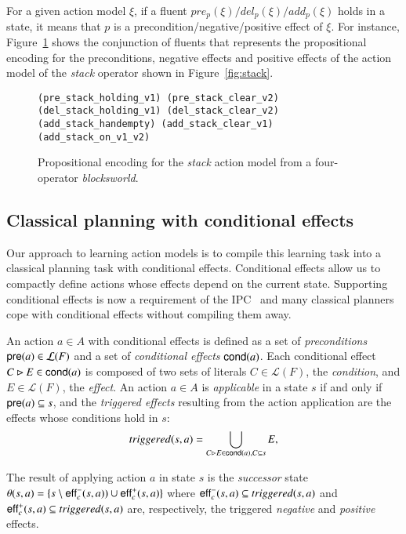 For a given action model $\xi$, if a fluent $pre_p(\xi)/del_p(\xi)/add_p(\xi)$ holds in a state, it means that $p$ is a precondition/negative/positive effect of $\xi$. For instance, Figure~\ref{fig:encodedstack} shows the conjunction of fluents that represents the propositional encoding for the preconditions, negative effects and positive effects of the action model of the {\em stack} operator shown in Figure~\ref{fig:stack}.

\begin{figure}[hbt!]
\begin{footnotesize}
\begin{verbatim}
(pre_stack_holding_v1) (pre_stack_clear_v2)
(del_stack_holding_v1) (del_stack_clear_v2)
(add_stack_handempty) (add_stack_clear_v1) (add_stack_on_v1_v2)
\end{verbatim}
\end{footnotesize}
 \caption{\small Propositional encoding for the {\em stack} action model from a four-operator {\em blocksworld}.}
\label{fig:encodedstack}
\end{figure}


\subsection{Classical planning with conditional effects}
\label{conditional_effects}

Our approach to learning action models is to compile this learning task into a classical planning task with conditional effects.  Conditional effects allow us to compactly define actions whose effects depend on the current state. Supporting conditional effects is now a requirement of the IPC~\cite{vallati:IPC:AIM2015} and many classical planners cope with conditional effects without compiling them away.

An action $a\in A$ with conditional effects is defined as a set of {\em preconditions} $\mathsf{pre}(a)\in\mathcal{L}(F)$ and a set of {\em conditional effects} $\mathsf{cond}(a)$. Each conditional effect $C\rhd E\in\mathsf{cond}(a)$ is composed of two sets of literals $C\in\mathcal{L}(F)$, the {\em condition}, and $E\in\mathcal{L}(F)$, the {\em effect}. An action $a\in A$ is {\em applicable} in a state $s$ if and only if $\mathsf{pre}(a)\subseteq s$, and the {\em triggered effects} resulting from the action application are the effects whose conditions hold in $s$:
\[
triggered(s,a)=\bigcup_{C\rhd E\in\mathsf{cond}(a),C\subseteq s} E,
\]

The result of applying action $a$ in state $s$ is the {\em successor} state $\theta(s,a)=\{s\setminus\mathsf{eff}_c^-(s,a))\cup\mathsf{eff}_c^+(s,a)\}$ where $\mathsf{eff}_c^-(s,a)\subseteq triggered(s,a)$ and $\mathsf{eff}_c^+(s,a)\subseteq triggered(s,a)$ are, respectively, the triggered {\em negative} and {\em positive} effects.


